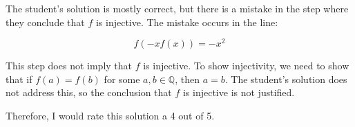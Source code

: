 The student's solution is mostly correct, but there is a mistake in the step where they conclude that $f$ is injective. The mistake occurs in the line:

\[ f(-xf(x)) = -x^2 \]

This step does not imply that $f$ is injective. To show injectivity, we need to show that if $f(a) = f(b)$ for some $a, b \in \mathbb{Q}$, then $a = b$. The student's solution does not address this, so the conclusion that $f$ is injective is not justified. 

Therefore, I would rate this solution a 4 out of 5.
